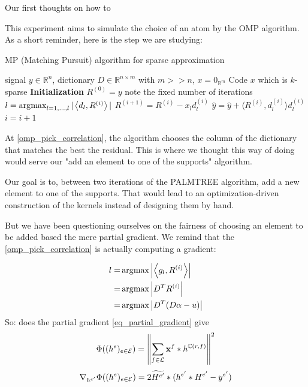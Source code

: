 Our first thoughts on how to 

This experiment aims to simulate the choice of an atom by the OMP algorithm. As a short reminder, here is the step we are studying:
\begin{algorithm} %
    \caption{MP (Matching Pursuit) algorithm for sparse approximation}
  \begin{algorithmic}[1]
    \Input signal $y \in \mathbb{R}^{n}$, dictionary $D \in \mathbb{R}^{n \times m}$ with $m>>n$, $x = 0_{\mathbb{R}^m}$
    \Output Code $x$ which is $k$-sparse
    \State \textbf{Initialization} $R^{(0)} = y$
     \Comment note the fixed number of iterations
      \State $l =  \operatorname*{\arg\!\max}_{l = 1,\dots,l} |\left< d_l,R^{(i)} \right>|$ \label{omp_pick_correlation}
      \State $R^{(i+1)} = R^{(i)}-x_l d_l^{(i)}$
      \State $\hat{y} = \hat{y}+\langle R^{(i)}, d_{l}^{(i)} \rangle d_{l}^{(i)}$
      \State $i = i + 1$
    \EndWhile
  \end{algorithmic}
\end{algorithm}

At \cref{omp_pick_correlation}, the algorithm chooses the column of the dictionary that matches the best the residual. This is where we thought this way of doing would serve our "add an element to one of the supports" algorithm.

Our goal is to, between two iterations of the PALMTREE algorithm, add a new element to one of the supports. That would lead to an optimization-driven construction of the kernels instead of designing them by hand.

But we have been questioning ourselves on the fairness of choosing an element to be added based the mere partial gradient. We remind that the \ref{omp_pick_correlation} is actually computing a gradient:

\begin{align*}
l =& \operatorname*{\arg\!\max} \left|\left< g_l,R^{(i)} \right>\right| \\
=& \operatorname*{\arg\!\max} \left| D^TR^{(i)}\right| \\
=& \operatorname*{\arg\!\max} \left| D^T(D\alpha - u)\right| \\
\end{align*}
So: does the partial gradient \ref{eq_partial_gradient} give 
\begin{align*}
\Phi((h^e)_{e \in \mathcal E}) = \left\| \sum_{f\in\mathcal L} \mathbf x^f * h^{\mathbb C(r,f)} \right\|^2
\end{align*}
\begin{align*} 
\nabla_{h^{e'}}\Phi((h^e)_{e \in \mathcal E}) = 2 \widetilde{H^{e'}} * (h^{e'}*H^{e'}-y^{e'})
\end{align*} \label{eq_partial_gradient}





